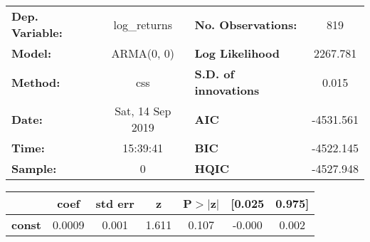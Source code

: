 \begin{center}
\begin{tabular}{lclc}
\toprule
\textbf{Dep. Variable:} &   log\_returns   & \textbf{  No. Observations:  } &    819      \\
\textbf{Model:}         &    ARMA(0, 0)    & \textbf{  Log Likelihood     } &  2267.781   \\
\textbf{Method:}        &       css        & \textbf{  S.D. of innovations} &   0.015     \\
\textbf{Date:}          & Sat, 14 Sep 2019 & \textbf{  AIC                } & -4531.561   \\
\textbf{Time:}          &     15:39:41     & \textbf{  BIC                } & -4522.145   \\
\textbf{Sample:}        &        0         & \textbf{  HQIC               } & -4527.948   \\
\bottomrule
\end{tabular}
\begin{tabular}{lcccccc}
               & \textbf{coef} & \textbf{std err} & \textbf{z} & \textbf{P$> |$z$|$} & \textbf{[0.025} & \textbf{0.975]}  \\
\midrule
\textbf{const} &       0.0009  &        0.001     &     1.611  &         0.107        &       -0.000    &        0.002     \\
\bottomrule
\end{tabular}
\end{center}
